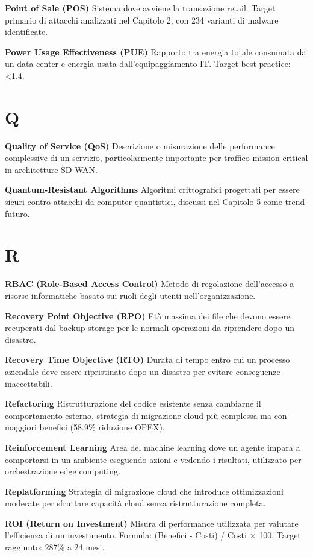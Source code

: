 \documentclass[12pt,a4paper,oneside]{book}
\numberwithin{figure}{chapter} %
\numberwithin{table}{chapter}  %
\begin{document}
\textbf{Point of Sale (POS)} Sistema dove avviene la transazione retail.
Target primario di attacchi analizzati nel Capitolo 2, con 234 varianti
di malware identificate.

\textbf{Power Usage Effectiveness (PUE)} Rapporto tra energia totale
consumata da un data center e energia usata dall'equipaggiamento IT.
Target best practice: \textless1.4.

\section{Q}\label{q}

\textbf{Quality of Service (QoS)} Descrizione o misurazione delle
performance complessive di un servizio, particolarmente importante per
traffico mission-critical in architetture SD-WAN.

\textbf{Quantum-Resistant Algorithms} Algoritmi crittografici progettati
per essere sicuri contro attacchi da computer quantistici, discussi nel
Capitolo 5 come trend futuro.

\section{R}\label{r}

\textbf{RBAC (Role-Based Access Control)} Metodo di regolazione
dell'accesso a risorse informatiche basato sui ruoli degli utenti
nell'organizzazione.

\textbf{Recovery Point Objective (RPO)} Età massima dei file che devono
essere recuperati dal backup storage per le normali operazioni da
riprendere dopo un disastro.

\textbf{Recovery Time Objective (RTO)} Durata di tempo entro cui un
processo aziendale deve essere ripristinato dopo un disastro per evitare
conseguenze inaccettabili.

\textbf{Refactoring} Ristrutturazione del codice esistente senza
cambiarne il comportamento esterno, strategia di migrazione cloud più
complessa ma con maggiori benefici (58.9\% riduzione OPEX).

\textbf{Reinforcement Learning} Area del machine learning dove un agente
impara a comportarsi in un ambiente eseguendo azioni e vedendo i
risultati, utilizzato per orchestrazione edge computing.

\textbf{Replatforming} Strategia di migrazione cloud che introduce
ottimizzazioni moderate per sfruttare capacità cloud senza
ristrutturazione completa.

\textbf{ROI (Return on Investment)} Misura di performance utilizzata per
valutare l'efficienza di un investimento. Formula: (Benefici - Costi) /
Costi × 100. Target raggiunto: 287\% a 24 mesi.
\end{document}
